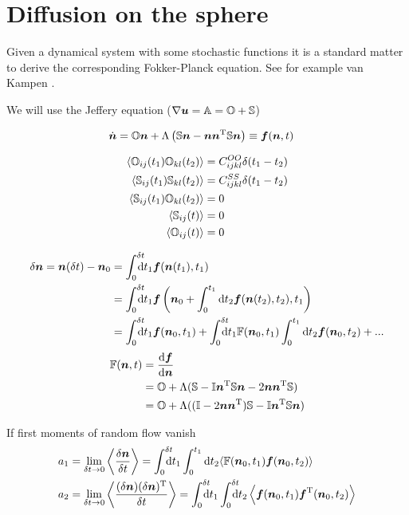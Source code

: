 \documentclass[thesis.tex]{subfiles}
\begin{document}
\chapter{Diffusion on the sphere}

Given a dynamical system with some stochastic functions it is a standard matter to derive the corresponding Fokker-Planck equation. See for example van Kampen \cite{kampen07}. 

We will use the Jeffery equation ($\nabla \mbox{\boldmath$u$} = \mathbb{A} = \mathbb{O} + \mathbb{S}$)

\begin{align*}
	\dot{\mbox{\boldmath$n$}} &= \mathbb{O} \mbox{\boldmath$n$} + \Lambda\left(\mathbb{S} \mbox{\boldmath$n$} - \mbox{\boldmath$n$} \mbox{\boldmath$n$}^{\mathrm T}\mathbb{S} \mbox{\boldmath$n$}\right)	\equiv \mbox{\boldmath$f$}(\mbox{\boldmath$n$}, t)
\end{align*}


\begin{align*}
	\left \langle \mathbb{O}_{ij}(t_1)\mathbb{O}_{kl}(t_2)\right \rangle &= C^{OO}_{ijkl}\delta(t_1-t_2) \\
	\left \langle \mathbb{S}_{ij}(t_1)\mathbb{S}_{kl}(t_2)\right \rangle &= C^{SS}_{ijkl}\delta(t_1-t_2) \\
	\left \langle \mathbb{S}_{ij}(t_1)\mathbb{O}_{kl}(t_2)\right \rangle &= 0 \\
	\left \langle \mathbb{S}_{ij}(t)\right \rangle &= 0 \\
	\left \langle \mathbb{O}_{ij}(t)\right \rangle &= 0
\end{align*}


\begin{align*}
	\delta \ve n = \ve n(\delta t) - \ve n_0 &= \int_0^{\delta t}\!\!\!\!\!\rd t_1 \ve f (\ve n(t_1 ), t_1)\\
	&= \int_0^{\delta t}\!\!\!\!\!\rd t_1 \ve f\left(\ve n_0 + \int_0^{t_1}\rd t_2 \ve f(\ve n(t_2),t_2), t_1\right)\\
	&= \int_0^{\delta t}\!\!\!\!\!\rd t_1 \ve f (\ve n_0, t_1)+\int_0^{\delta t}\!\!\!\!\!\rd t_1 \ma F (\ve n_0, t_1)\int_0^{t_1}\rd t_2 \ve f(\ve n_0, t_2) + ...
\end{align*}
\begin{align*}
	\mathbb{F}(\mbox{\boldmath$n$}, t) &= \frac{\mathrm{d} \mbox{\boldmath$f$}}{\mathrm{d} \mbox{\boldmath$n$}} \\
	&= \mathbb{O} + \Lambda(\mathbb{S} - \mathbb{I} \mbox{\boldmath$n$}^{\mathrm T} \mathbb{S} \mbox{\boldmath$n$} - 2\mbox{\boldmath$n$}\mbox{\boldmath$n$}^{\mathrm T} \mathbb{S}) \\
	& = \mathbb{O} + \Lambda( (\mathbb{I} - 2\mbox{\boldmath$n$} \mbox{\boldmath$n$}^{\mathrm T})\mathbb{S} - \mathbb{I} \mbox{\boldmath$n$}^{\mathrm T} \mathbb{S} \mbox{\boldmath$n$} )
\end{align*}

If first moments of random flow vanish
\begin{align*}
	a_1 &= \lim_{\delta t\to0}\left\langle\frac{\delta \ve n}{\delta t}\right\rangle = \int_0^{\delta t}\!\!\!\!\!\rd t_1\int_0^{t_1}\rd t_2\langle \ma F(\ve n_0,t_1)\ve f(\ve n_0, t_2)\rangle\\
	a_2 &= \lim_{\delta t\to0}\left\langle\frac{(\delta \ve n)(\delta \ve n)\transpose}{\delta t}\right\rangle = \int_0^{\delta t}\!\!\!\!\!\rd t_1 \int_0^{\delta t}\!\!\!\!\!\rd t_2 \left\langle\ve f(\ve n_0,t_1) \ve f\transpose(\ve n_0, t_2)\right\rangle
\end{align*}
\end{document}
